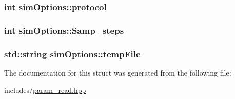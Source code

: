\subsubsection[{\texorpdfstring{protocol}{protocol}}]{\setlength{\rightskip}{0pt plus 5cm}int sim\+Options\+::protocol}\hypertarget{structsimOptions_a0b1b41d907adf31c75d5b9e9a413931d}{}\label{structsimOptions_a0b1b41d907adf31c75d5b9e9a413931d}
\subsubsection[{\texorpdfstring{Samp\+\_\+steps}{Samp_steps}}]{\setlength{\rightskip}{0pt plus 5cm}int sim\+Options\+::\+Samp\+\_\+steps}\hypertarget{structsimOptions_a5890487eea2252d4d84f67615269128f}{}\label{structsimOptions_a5890487eea2252d4d84f67615269128f}
\subsubsection[{\texorpdfstring{temp\+File}{tempFile}}]{\setlength{\rightskip}{0pt plus 5cm}std\+::string sim\+Options\+::temp\+File}\hypertarget{structsimOptions_a42a20f246c7029967d29a15e4d5aac16}{}\label{structsimOptions_a42a20f246c7029967d29a15e4d5aac16}


The documentation for this struct was generated from the following file\+:\begin{DoxyCompactItemize}
\item 
includes/\hyperlink{param__read_8hpp}{param\+\_\+read.\+hpp}\end{DoxyCompactItemize}
